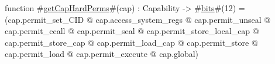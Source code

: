 function #\hyperref[zgetCapHardPerms]{getCapHardPerms}#(cap) : Capability -> #\hyperref[zbits]{bits}#(12) =
   (cap.permit_set_CID
  @ cap.access_system_regs
  @ cap.permit_unseal
  @ cap.permit_ccall
  @ cap.permit_seal
  @ cap.permit_store_local_cap
  @ cap.permit_store_cap
  @ cap.permit_load_cap
  @ cap.permit_store
  @ cap.permit_load
  @ cap.permit_execute
  @ cap.global)
